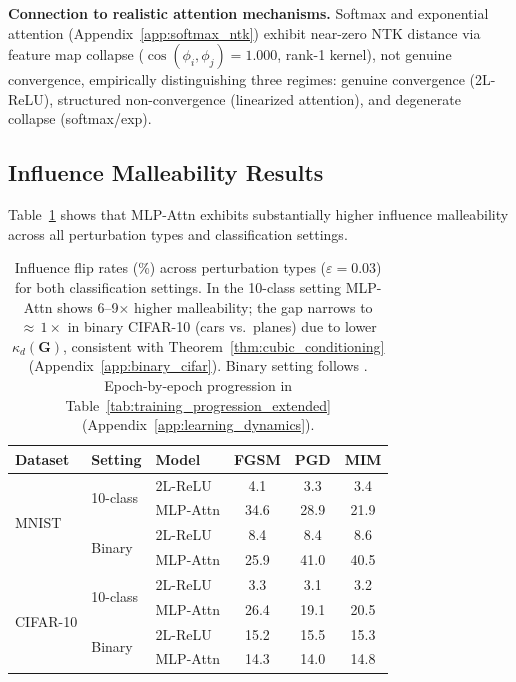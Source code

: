 \documentclass{article}
\theoremstyle{plain}
\theoremstyle{definition}
\theoremstyle{remark}
\begin{document}
\textbf{Connection to realistic attention mechanisms.} Softmax and exponential attention (Appendix~\ref{app:softmax_ntk}) exhibit near-zero NTK distance via feature map collapse ($\cos(\phi_i,\phi_j)=1.000$, rank-1 kernel), not genuine convergence, empirically distinguishing three regimes: genuine convergence (2L-ReLU), structured non-convergence (linearized attention), and degenerate collapse (softmax/exp).

\subsection{Influence Malleability Results}

Table~\ref{tab:malleability} shows that MLP-Attn exhibits substantially higher influence malleability across all perturbation types and classification settings.

\begin{table}[t]
\caption{Influence flip rates (\%) across perturbation types ($\varepsilon=0.03$) for both classification settings. In the 10-class setting MLP-Attn shows 6--9$\times$ higher malleability; the gap narrows to ${\approx}\,1\times$ in binary CIFAR-10 (cars vs.\ planes) due to lower $\kappa_d(\mathbf{G})$, consistent with Theorem~\ref{thm:cubic_conditioning} (Appendix~\ref{app:binary_cifar}). Binary setting follows \citet{zhang2022rethinking}. Epoch-by-epoch progression in Table~\ref{tab:training_progression_extended} (Appendix~\ref{app:learning_dynamics}).}
\label{tab:malleability}
\vskip 0.1in
\begin{center}
\begin{small}
\begin{tabular}{lllccc}
\toprule
\textbf{Dataset} & \textbf{Setting} & \textbf{Model} & \textbf{FGSM} & \textbf{PGD} & \textbf{MIM} \\
\midrule
\multirow{4}{*}{MNIST} & \multirow{2}{*}{10-class} & 2L-ReLU & 4.1 & 3.3 & 3.4 \\
& & MLP-Attn & 34.6 & 28.9 & 21.9 \\
\cmidrule(lr){2-6}
& \multirow{2}{*}{Binary} & 2L-ReLU & 8.4 & 8.4 & 8.6 \\
& & MLP-Attn & 25.9 & 41.0 & 40.5 \\
\midrule
\multirow{4}{*}{CIFAR-10} & \multirow{2}{*}{10-class} & 2L-ReLU & 3.3 & 3.1 & 3.2 \\
& & MLP-Attn & 26.4 & 19.1 & 20.5 \\
\cmidrule(lr){2-6}
& \multirow{2}{*}{Binary} & 2L-ReLU & 15.2 & 15.5 & 15.3 \\
& & MLP-Attn & 14.3 & 14.0 & 14.8 \\
\bottomrule
\end{tabular}
\end{small}
\end{center}
\vskip -0.1in
\end{table}
\end{document}
